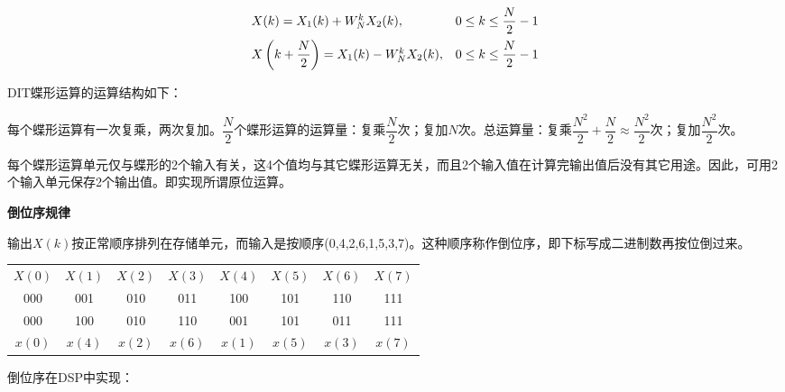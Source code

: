 \documentclass[cn, hazy, blue, normal, 14pt]{elegantnote}
\begin{document}
\begin{equation}
\begin{array}{ll}
    X(k)=X_1(k)+W_N^k X_2(k), & 0\leq k\leq \dfrac{N}{2}-1 \\
    \addlinespace
    X\left(k+\dfrac{N}{2}\right)=X_1(k)-W_N^k X_2(k), & 0\leq k\leq \dfrac{N}{2}-1
\end{array}
\end{equation}

DIT蝶形运算的运算结构如下：

\begin{center}
\end{center}

每个蝶形运算有一次复乘，两次复加。$\dfrac{N}{2}$个蝶形运算的运算量：复乘$\dfrac{N}{2}$次；复加$N$次。总运算量：复乘$\dfrac{N^2}{2}+\dfrac{N}{2}\approx \dfrac{N^2}{2}$次；复加$\dfrac{N^2}{2}$次。

每个蝶形运算单元仅与蝶形的2个输入有关，这4个值均与其它蝶形运算无关，而且2个输入值在计算完输出值后没有其它用途。因此，可用2个输入单元保存2个输出值。即实现所谓原位运算。

\textbf{倒位序规律}

输出$X(k)$按正常顺序排列在存储单元，而输入是按顺序(0,4,2,6,1,5,3,7)。这种顺序称作倒位序，即下标写成二进制数再按位倒过来。

\begin{table}[htbp]
\centering
\begin{tabular}{|c|c|c|c|c|c|c|c|}
    $X(0)$ & $X(1)$ & $X(2)$ & $X(3)$ & $X(4)$ & $X(5)$ & $X(6)$ & $X(7)$ \\
    000 & 001 & 010 & 011 & 100 & 101 & 110 & 111 \\
    000 & 100 & 010 & 110 & 001 & 101 & 011 & 111 \\
    $x(0)$ & $x(4)$ & $x(2)$ & $x(6)$ & $x(1)$ & $x(5)$ & $x(3)$ & $x(7)$
\end{tabular}
\end{table}

倒位序在DSP中实现：
\end{document}

